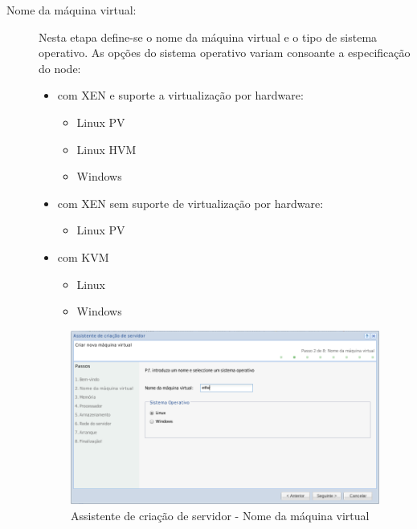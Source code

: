 \begin{description}
	\item[Nome da máquina virtual:] Nesta etapa define-se o nome da máquina virtual e o tipo de sistema operativo. As opções do sistema operativo variam consoante a especificação do node:
		\begin{itemize}
			\item com XEN e suporte a virtualização por hardware:
			\begin{itemize}
				\item Linux PV
				\item Linux HVM
				\item Windows
			\end{itemize}
 			\item com XEN sem suporte de virtualização por hardware:
			\begin{itemize}
				\item Linux PV
			\end{itemize}
 			\item com KVM
			\begin{itemize}
				\item Linux
				\item Windows
			\end{itemize}
		\end{itemize}
	
		\begin{figure}[H]
        		\begin{center}
		        \includegraphics[scale=0.5]{screenshots/server_createwiz_name.png}
        		\caption{Assistente de criação de servidor - Nome da máquina virtual}
	        	\label{fig:server_createwiz_name}
	        	\end{center}
		\end{figure}
 

\end{description}
